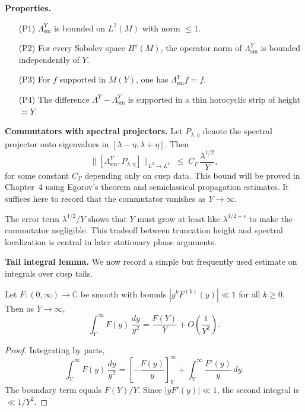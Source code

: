 \medskip
\noindent
\textbf{Properties.}
\begin{itemize}
  \item[(P1)] $\Lambda^{Y}_{\mathrm{sm}}$ is bounded on $L^{2}(M)$ with norm $\le 1$.
  \item[(P2)] For every Sobolev space $H^{s}(M)$, the operator norm
              of $\Lambda^{Y}_{\mathrm{sm}}$ is bounded independently of $Y$.
  \item[(P3)] For $f$ supported in $M(Y)$, one has $\Lambda^{Y}_{\mathrm{sm}} f=f$.
  \item[(P4)] The difference $\Lambda^{Y}-\Lambda^{Y}_{\mathrm{sm}}$ is supported
              in a thin horocyclic strip of height $\asymp Y$.
\end{itemize}

\medskip
\noindent
\textbf{Commutators with spectral projectors.}
Let $P_{\lambda,\eta}$ denote the spectral projector
onto eigenvalues in $[\lambda-\eta,\lambda+\eta]$.
Then
\[
  \big\| [\Lambda^{Y}_{\mathrm{sm}}, P_{\lambda,\eta}] \big\|_{L^{2}\to L^{2}}
  \;\le\; C_{\Gamma} \,\frac{\lambda^{1/2}}{Y},
\]
for some constant $C_{\Gamma}$ depending only on cusp data.
This bound will be proved in Chapter~4 using Egorov’s theorem and semiclassical
propagation estimates.  
It suffices here to record that the commutator vanishes as $Y\to\infty$.

\begin{remark}
The error term $\lambda^{1/2}/Y$ shows that $Y$ must grow at least
like $\lambda^{1/2+\epsilon}$ to make the commutator negligible.
This tradeoff between truncation height and spectral localization
is central in later stationary phase arguments.
\end{remark}

\medskip
\noindent
\textbf{Tail integral lemma.}
We now record a simple but frequently used estimate on integrals
over cusp tails.

\begin{lemma}\label{lem:tail-integral}
Let $F:(0,\infty)\to\mathbb{C}$ be smooth with bounds
$|y^{k} F^{(k)}(y)| \ll 1$ for all $k \ge 0$.
Then as $Y\to\infty$,
\[
  \int_{Y}^{\infty} F(y)\,\frac{dy}{y^{2}}
  = \frac{F(Y)}{Y} + O\!\left(\frac{1}{Y^{2}}\right).
\]
\end{lemma}

\begin{proof}
Integrating by parts,
\[
  \int_{Y}^{\infty} F(y)\,\frac{dy}{y^{2}}
  = \left[-\frac{F(y)}{y}\right]_{Y}^{\infty}
    + \int_{Y}^{\infty} \frac{F'(y)}{y}\,dy.
\]
The boundary term equals $F(Y)/Y$.
Since $|y F'(y)|\ll 1$, the second integral is $\ll 1/Y^{2}$.
\end{proof}

